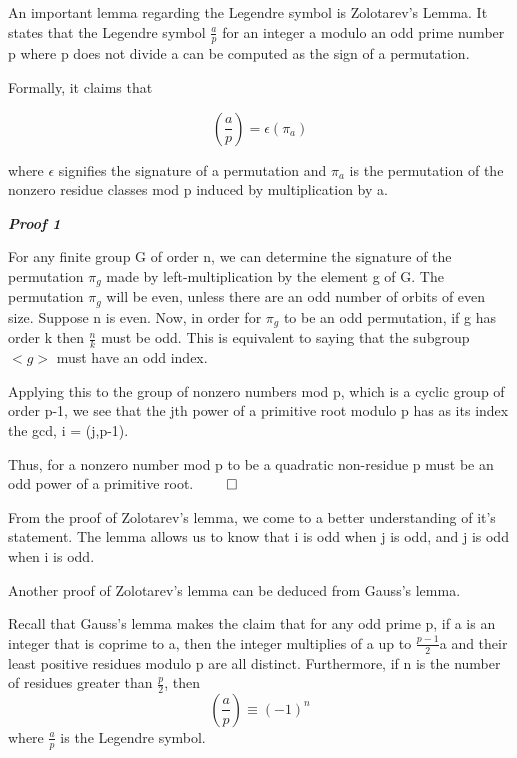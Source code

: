 \documentclass{article}
\begin{document}
\begin{spacing}{1.1}
An important lemma regarding the Legendre symbol is Zolotarev's Lemma.  It states that the Legendre symbol $\frac{a}{p}$ for an integer a modulo an odd prime number p where p does not divide a can be computed as the sign of a permutation.  

Formally, it claims that 

$$
(\frac{a}{p}) = \epsilon(\pi_a)
$$


where $\epsilon$ signifies the signature of a permutation and $\pi_a$ is the permutation of the nonzero residue classes mod p induced by multiplication by a.  

\vspace{3mm}

\textbf{\emph{Proof 1}
}
\vspace{3mm}

For any finite group G of order n, we can determine the signature of the permutation $\pi_g$ made by left-multiplication by the element g of G.  The permutation $\pi_g$ will be even, unless there are an odd number of orbits of even size.  Suppose n is even.  Now, in order for $\pi_g$ to be an odd permutation, if g has order k then $\frac{n}{k}$ must be odd.  This is equivalent to saying that the subgroup $<g>$ must have an odd index.  

Applying this to the group of nonzero numbers mod p, which is a cyclic group of order p-1, we see that the jth power of a primitive root modulo p has as its index the gcd, i = (j,p-1).  

Thus, for a nonzero number mod p to be a quadratic non-residue p must be an odd power of a primitive root.  $\qed$

From the proof of Zolotarev's lemma, we come to a better understanding of it's statement.  The lemma allows us to know that i is odd when j is odd, and j is odd when i is odd.  

\vspace{3 mm}

Another proof of Zolotarev's lemma can be deduced from Gauss's lemma.  

Recall that Gauss's lemma makes the claim that for any odd prime p, if a is an integer that is coprime to a, then the integer multiplies of a up to $\frac{p-1}{2}$a and their least positive residues modulo p are all distinct.  Furthermore, if n is the number of residues greater than $\frac{p}{2}$, then 
$$
(\frac{a}{p}) \equiv (-1)^n
$$
where $\frac{a}{p}$ is the Legendre symbol.  




\end{spacing}
\end{document}
